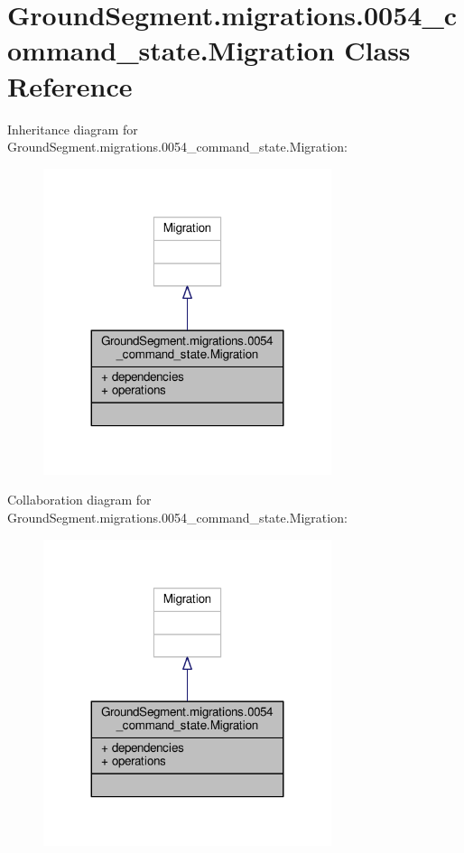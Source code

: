 \hypertarget{class_ground_segment_1_1migrations_1_10054__command__state_1_1_migration}{}\section{Ground\+Segment.\+migrations.0054\+\_\+command\+\_\+state.Migration Class Reference}
\label{class_ground_segment_1_1migrations_1_10054__command__state_1_1_migration}


Inheritance diagram for Ground\+Segment.\+migrations.0054\+\_\+command\+\_\+state.Migration\+:\nopagebreak
\begin{figure}[H]
\begin{center}
\leavevmode
\includegraphics[width=239pt]{class_ground_segment_1_1migrations_1_10054__command__state_1_1_migration__inherit__graph}
\end{center}
\end{figure}


Collaboration diagram for Ground\+Segment.\+migrations.0054\+\_\+command\+\_\+state.Migration\+:\nopagebreak
\begin{figure}[H]
\begin{center}
\leavevmode
\includegraphics[width=239pt]{class_ground_segment_1_1migrations_1_10054__command__state_1_1_migration__coll__graph}
\end{center}
\end{figure}
